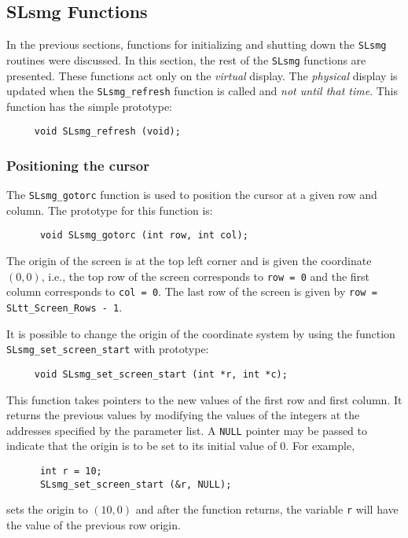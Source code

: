 \subsection{SLsmg Functions}

  In the previous sections, functions for initializing and shutting down the
  \verb|SLsmg| routines were discussed.  In this section, the rest of the
  \verb|SLsmg| functions are presented.  These functions act only on the {\em
  virtual} display.  The {\em physical} display is updated when the
  \verb|SLsmg_refresh| function is called and {\em not until that time}.
  This function has the simple prototype:
\begin{verbatim}   
     void SLsmg_refresh (void);
\end{verbatim} 
  
\subsubsection{Positioning the cursor}

  The \verb|SLsmg_gotorc| function is used to position the cursor at a given
  row and column.  The prototype for this function is:
\begin{verbatim} 
      void SLsmg_gotorc (int row, int col);
\end{verbatim}
  The origin of the screen is at the top left corner and is given the
  coordinate $(0, 0)$, i.e., the top row of the screen corresponds to
  \verb|row = 0| and the first column corresponds to \verb|col = 0|.  The last
  row of the screen is given by \verb|row = SLtt_Screen_Rows - 1|.
  
  It is possible to change the origin of the coordinate system by using the
  function \verb|SLsmg_set_screen_start| with prototype:
\begin{verbatim}   
     void SLsmg_set_screen_start (int *r, int *c);
\end{verbatim}
  This function takes pointers to the new values of the first row and first
  column.  It returns the previous values by modifying the values of the
  integers at the addresses specified by the parameter list.  A \verb|NULL|
  pointer may be passed to indicate that the origin is to be set to its
  initial value of $0$.  For example,
\begin{verbatim} 
      int r = 10;
      SLsmg_set_screen_start (&r, NULL);
\end{verbatim}
  sets the origin to $(10, 0)$ and after the function returns, the variable
  \verb|r| will have the value of the previous row origin.

